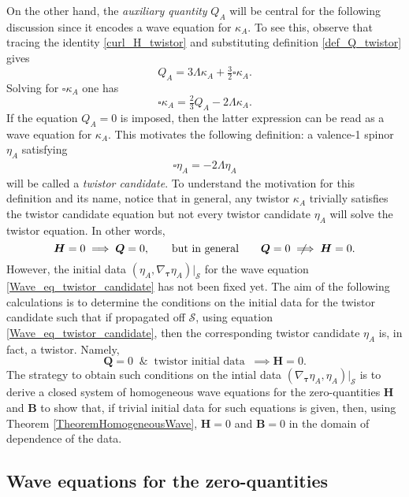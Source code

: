 \documentclass[10pt,a4paper]{article}
\theoremstyle{plain}
\def\bmB{{\bm B}}
\def\bmH{{\bm H}}
\def\bmQ{{\bm Q}}
\newcommand{\notimplies}{%
  \mathrel{{\ooalign{\hidewidth$\not\phantom{=}$\hidewidth\cr$\implies$}}}}
\begin{document}
  On the other hand, the \emph{auxiliary quantity}
  $Q_A$ will be central for the following discussion since it
  encodes a wave equation for $\kappa_A$. To see this, observe that
  tracing the identity \eqref{curl_H_twistor} and substituting 
  definition \eqref{def_Q_twistor} gives
\begin{equation}\label{Q_to_box_twistor_candidate}
Q_{A} = 3 \Lambda \kappa _{A} + \tfrac{3}{2} \square \kappa _{A}.
\end{equation}
Solving for $\square \kappa _{A}$ one has
\[
\square \kappa _{A} = \tfrac{2}{3} Q_{A} -2 \Lambda \kappa _{A}.
\]
If the equation $Q_{A}=0$ is imposed, then
the latter expression can be read as a wave equation for $\kappa_A$.
This motivates the following definition: a valence-1 spinor $\eta_A$ satisfying
\begin{align} \label{Wave_eq_twistor_candidate}
\square \eta _{A} = -2 \Lambda  \eta _{A}
\end{align}
will be called a \emph{twistor candidate}. To understand the
motivation for this definition and its name, notice that in general,
any twistor $\kappa_A$ trivially satisfies the twistor candidate
equation but not every twistor candidate $\eta_A$ will solve the
twistor equation. In other words,
\[
\bmH=0 \implies \bmQ =0, \qquad \text{but in general} \qquad \bmQ =0 \notimplies \bmH=0.
\]
However,  the initial data $(\eta_A, \nabla_{\bm\tau}
\eta_A)|_{\mathcal{S}}$ for the wave equation
\eqref{Wave_eq_twistor_candidate} has not been fixed yet. The aim of the following
calculations is to determine the conditions on the initial data for the
twistor candidate such that if propagated off $\mathcal{S}$, using
equation \eqref{Wave_eq_twistor_candidate}, then the corresponding twistor
candidate $\eta_A$ is, in fact, a twistor. Namely,
\begin{equation}
\bmQ =0 \;\;\&\;\; \text{twistor initial data} \;\;\implies \bmH=0.
\end{equation}
The strategy to obtain such conditions on the intial data
$(\nabla_{\bm\tau} \eta_A, \eta_A)|_{\mathcal{S}}$  is to derive a closed
system of homogeneous wave equations for the zero-quantities $\bmH$
and $\bmB$ to show that, if trivial initial data for such
equations is given, then, using Theorem \ref{TheoremHomogeneousWave},
$\bmH=0$ and $\bmB=0$ in the domain of dependence of the data.

\subsection{Wave equations for the zero-quantities}
\end{document}
